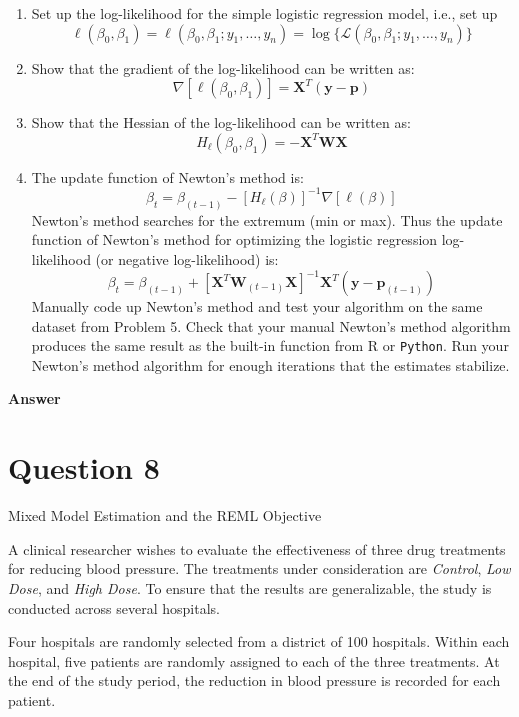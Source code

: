 \documentclass[letterpaper]{article}
\begin{document}
	\begin{enumerate}
		\item Set up the log-likelihood for the simple logistic regression model, i.e., set up
		\[
		\ell(\beta_0, \beta_1) = \ell(\beta_0, \beta_1; y_1, \ldots, y_n) = \log\{\mathcal{L}(\beta_0, \beta_1; y_1, \ldots, y_n)\}
		\]
		
		\item Show that the gradient of the log-likelihood can be written as:
		\[
		\nabla[\ell(\beta_0, \beta_1)] = \mathbf{X}^T(\mathbf{y} - \mathbf{p})
		\]
		
		\item Show that the Hessian of the log-likelihood can be written as:
		\[
		H_\ell(\beta_0, \beta_1) = -\mathbf{X}^T\mathbf{W}\mathbf{X}
		\]
		
		\item The update function of Newton's method is:
		\[
		\beta_t = \beta_{(t-1)} - [H_\ell(\beta)]^{-1}\nabla[\ell(\beta)]
		\]
		Newton's method searches for the extremum (min or max). Thus the update function of Newton's method for optimizing the logistic regression log-likelihood (or negative log-likelihood) is:
		\[
		\beta_t = \beta_{(t-1)} + [\mathbf{X}^T\mathbf{W}_{(t-1)}\mathbf{X}]^{-1}\mathbf{X}^T(\mathbf{y} - \mathbf{p}_{(t-1)})
		\]
		Manually code up Newton's method and test your algorithm on the same dataset from Problem 5. Check that your manual Newton's method algorithm produces the same result as the built-in function from R or \texttt{Python}. Run your Newton's method algorithm for enough iterations that the estimates stabilize.
	\end{enumerate}
	
	\textbf{Answer}
	
	\clearpage
	
	\section{Question 8}
	{\color{deepred}  Mixed Model Estimation and the REML Objective}
		
		A clinical researcher wishes to evaluate the effectiveness of three drug treatments for reducing blood pressure. The treatments under consideration are \textit{Control}, \textit{Low Dose}, and \textit{High Dose}. To ensure that the results are generalizable, the study is conducted across several hospitals.
		
		Four hospitals are randomly selected from a district of 100 hospitals. Within each hospital, five patients are randomly assigned to each of the three treatments. At the end of the study period, the reduction in blood pressure is recorded for each patient.
		
\end{document}
